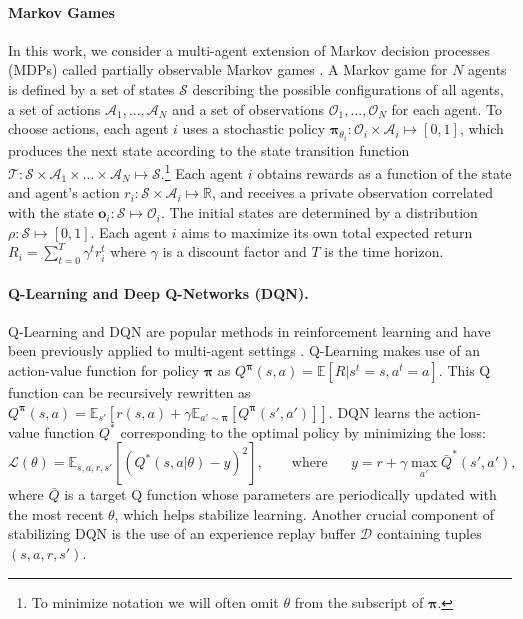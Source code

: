 \documentclass{article}
\newcommand{\pol}[0]{\pmb{\pi}}
\begin{document}
\paragraph{Markov Games}
In this work, we consider a multi-agent extension of Markov decision processes (MDPs) called partially observable Markov games \cite{littman1994markov}. A Markov game for $N$ agents is defined by a set of states $\mathcal{S}$ describing the possible configurations of all agents, a set of actions $\mathcal{A}_1,...,\mathcal{A}_N$ and a set of observations $\mathcal{O}_1,...,\mathcal{O}_N$ for each agent. To choose actions, each agent $i$ uses a stochastic policy $\pol_{\theta_i} : \mathcal{O}_i \times \mathcal{A}_i \mapsto [0,1]$, which produces the next state according to the state transition function $\mathcal{T} : \mathcal{S} \times \mathcal{A}_1 \times ... \times \mathcal{A}_N \mapsto \mathcal{S}$.\footnote{To minimize notation we will often omit $\theta$ from the subscript of $\pol$.} 
Each agent $i$ obtains rewards as a function of the state and agent's action $r_i : \mathcal{S} \times \mathcal{A}_i \mapsto \mathbb{R}$, and receives a private observation correlated with the state $\mathbf{o}_i : \mathcal{S} \mapsto \mathcal{O}_i$. The initial states are determined by a distribution $\rho : \mathcal{S} \mapsto [0,1]$. Each agent $i$ aims to maximize its own total expected return $R_i = \sum_{t=0}^T \gamma^t r^t_i$ where $\gamma$ is a discount factor and $T$ is the time horizon.




\paragraph{Q-Learning and Deep Q-Networks (DQN).}
Q-Learning and DQN \cite{mnih2015human} are popular methods in reinforcement learning and have been previously applied to multi-agent settings \cite{foerster16b,hyper_q}. Q-Learning makes use of an action-value function for policy $\pol$ as $Q^{\pol}(s, a) = \mathbb{E}[R | s^t = s, a^t = a]$.
This Q function can be recursively rewritten as $Q^{\pol}(s, a) = \mathbb{E}_{s'}[r(s,a) + \gamma \mathbb{E}_{a' \sim \pol}[Q^{\pol}(s', a')]]$. DQN learns the action-value function $Q^*$ corresponding to the optimal policy by minimizing the loss:
\begin{equation}
    \mathcal{L}(\theta) = \mathbb{E}_{s,a,r,s'}[(Q^*(s,a|\theta) - y)^2], \qquad
    \text{where~ } \quad y = r + \gamma \max_{a'} \bar{Q}^*(s', a'),
\end{equation}
where $\bar{Q}$ is a target Q function whose parameters are periodically updated with the most recent $\theta$, which helps stabilize learning. Another crucial component of stabilizing DQN is the use of an experience replay buffer $\mathcal{D}$ containing tuples $(s,a,r,s')$.
\end{document}
